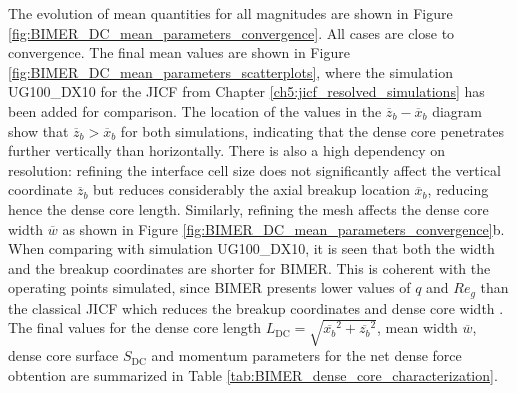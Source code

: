 The evolution of mean quantities for all magnitudes are shown in Figure \ref{fig:BIMER_DC_mean_parameters_convergence}. All cases are close to convergence. The final mean values are shown in Figure \ref{fig:BIMER_DC_mean_parameters_scatterplots}, where the simulation UG100\_DX10 for the JICF from Chapter \ref{ch5:jicf_resolved_simulations} has been added for comparison. The location of the values in the $\overline{z}_b - \overline{x}_b$ diagram show that $\overline{z}_b > \overline{x}_b$ for both simulations, indicating that the dense core penetrates further vertically than horizontally. There is also a high dependency on resolution: refining the interface cell size does not significantly affect the vertical coordinate $\overline{z}_b$ but reduces considerably the axial breakup location $\overline{x}_b$, reducing hence the dense core length. Similarly, refining the mesh affects the dense core width $\overline{w}$ as shown in Figure \ref{fig:BIMER_DC_mean_parameters_convergence}b.  When comparing with simulation UG100\_DX10, it is seen that both the width and the breakup coordinates are shorter for BIMER. This is coherent with the operating points simulated, since BIMER presents lower values of $q$ and $Re_g$ than the classical JICF which reduces the breakup coordinates and dense core width . The final values for the dense core length $L_\mathrm{DC} = \sqrt{\overline{x_b}^2 + \overline{z_b}^2}$, mean width $\overline{w}$, dense core surface $S_\mathrm{DC}$ and momentum parameters for the net dense force obtention are summarized in Table \ref{tab:BIMER_dense_core_characterization}.


